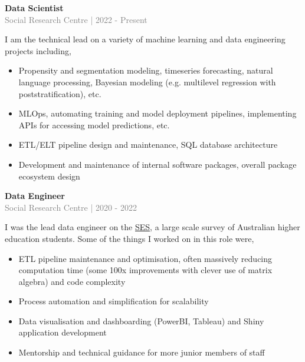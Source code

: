 \documentclass[10pt]{article}
\begin{document}
{\bf Data Scientist} \\
\textcolor{gray}{Social Research Centre | 2022 - Present} \\[3pt]
\begin{small}

I am the technical lead on a variety of machine learning and data engineering projects including,

\begin{itemize}
\item Propensity and segmentation modeling, timeseries forecasting, natural language processing, 
Bayesian modeling (e.g. multilevel regression with poststratification), etc.
\item MLOps, automating training and model deployment pipelines, implementing APIs for accessing model predictions, etc. 
\item ETL/ELT pipeline design and maintenance, SQL database architecture
\item Development and maintenance of internal software packages, overall package ecosystem design
\end{itemize}

\end{small}
\vspace{0.5cm}
{\bf Data Engineer} \\
\textcolor{gray}{Social Research Centre | 2020 - 2022} \\[3pt]
\begin{small}

I was the lead data engineer on the \href{https://www.qilt.edu.au/surveys/student-experience-survey-(ses)}{SES}, a large scale survey of Australian higher education students.
Some of the things I worked on in this role were,

\begin{itemize}
\item ETL pipeline maintenance and optimisation, often massively reducing computation time 
(some 100x improvements with clever use of matrix algebra) and code complexity
\item Process automation and simplification for scalability
\item Data visualisation and dashboarding (PowerBI, Tableau) and Shiny application development
\item Mentorship and technical guidance for more junior members of staff
\end{itemize}

\end{small}
\vspace{0.5cm}
\end{document}
